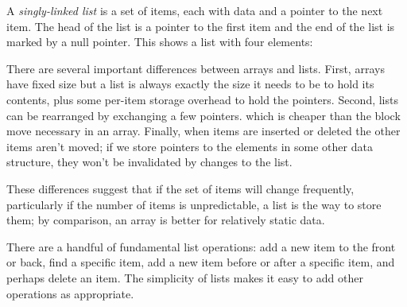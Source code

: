 A \emph{singly-linked list} is a set of items, each with data
and a pointer to the next item. The head of the list is a pointer to the
first item and the end of the list is marked by a null pointer. This shows
a list with four elements:
\begin{center}
\end{center}
There are several important differences between arrays and lists. First,
arrays have fixed size but a list is always exactly the size it needs to be
to hold its contents, plus some per-item storage overhead to hold the
pointers. Second, lists can be rearranged by exchanging a few pointers.
which is cheaper than the block move necessary in an array. Finally, when
items are inserted or deleted the other items aren't moved; if we store
pointers to the elements in some other data structure, they won't be
invalidated by changes to the list.

These differences suggest that if the set of items will change frequently,
particularly if the number of items is unpredictable, a list is the way to
store them; by comparison, an array is better for relatively static data.

There are a handful of fundamental list operations: add a new item to the
front or back, find a specific item, add a new item before or after a
specific item, and perhaps delete an item. The simplicity of lists makes it
easy to add other operations as appropriate.

